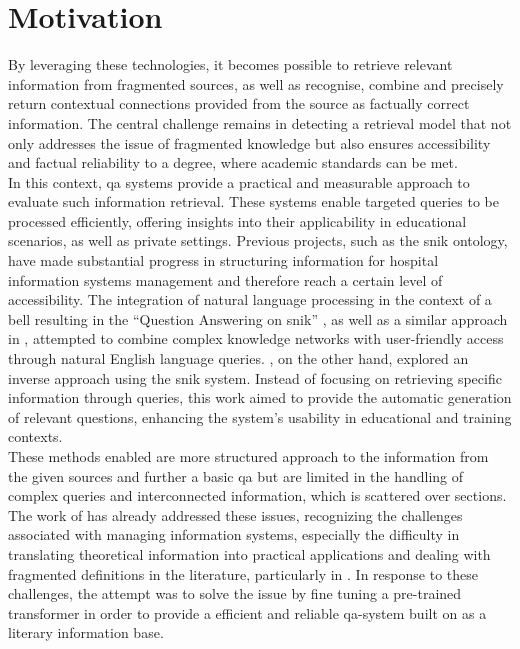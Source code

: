 \section{Motivation}\label{sec:motivation}
By leveraging these technologies, it becomes possible to retrieve relevant information from fragmented sources, as well as recognise, combine and precisely return contextual connections provided from the source as factually correct information. 
The central challenge remains in detecting a retrieval model that not only addresses the issue of fragmented knowledge but also ensures accessibility and factual reliability to a degree, where academic standards can be met.\\ 
In this context, \ac{qa} systems provide a practical and measurable approach to evaluate such information retrieval. 
These systems enable targeted queries to be processed efficiently, offering insights into their applicability in educational scenarios, as well as private settings.
% 
Previous projects, such as the \ac{snik} ontology, have made substantial progress in structuring information for hospital information systems management and therefore reach a certain level of accessibility. 
The integration of natural language processing in the context of a \ac{bell} resulting in the \enquote{Question Answering on \ac{snik}} \citep{hannesbell, hannesbell_skill}, as well as a similar approach in \citet{snikquiz}, attempted to combine complex knowledge networks with user-friendly access through natural English language queries. \citet{arneba}, on the other hand, explored an inverse approach using the \ac{snik} system. Instead of focusing on retrieving specific information through queries, this work aimed to provide the automatic generation of relevant questions, enhancing the system's usability in educational and training contexts.\\
%
These methods enabled are more structured approach to the information from the given sources and further a basic \ac{qa} but are limited in the handling of complex queries and interconnected information, which is scattered over sections.
The work of \citet{Paul_Keller} has already addressed these issues, recognizing the challenges associated with managing information systems, especially the difficulty in translating theoretical information into practical applications and dealing with fragmented definitions in the literature, particularly in \citet{bb2}. 
In response to these challenges, the attempt was to solve the issue by fine tuning a pre-trained transformer in order to provide a efficient and reliable \ac{qa}-system built on \citet{bb2} as a literary information base.
